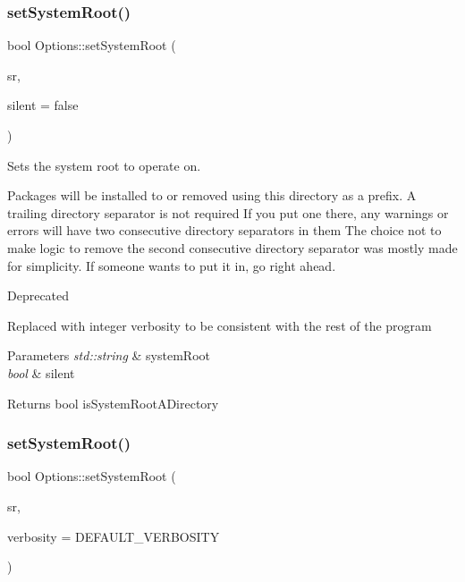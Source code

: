 \subsubsection{\texorpdfstring{setSystemRoot()}{setSystemRoot()}\hspace{0.1cm}{\footnotesize\ttfamily [1/2]}}
{\footnotesize\ttfamily bool Options\+::set\+System\+Root (\begin{DoxyParamCaption}\item[{std\+::string}]{sr,  }\item[{bool}]{silent = {\ttfamily false} }\end{DoxyParamCaption})}



Sets the system root to operate on. 

Packages will be installed to or removed using this directory as a prefix. A trailing directory separator is not required If you put one there, any warnings or errors will have two consecutive directory separators in them The choice not to make logic to remove the second consecutive directory separator was mostly made for simplicity. If someone wants to put it in, go right ahead.

\begin{DoxyRefDesc}{Deprecated}
\item[\mbox{\hyperlink{deprecated__deprecated000011}{Deprecated}}]Replaced with integer verbosity to be consistent with the rest of the program\end{DoxyRefDesc}



\begin{DoxyParams}{Parameters}
{\em std\+::string} & system\+Root \\
\hline
{\em bool} & silent\\
\hline
\end{DoxyParams}
\begin{DoxyReturn}{Returns}
bool is\+System\+Root\+A\+Directory 
\end{DoxyReturn}
\mbox{\label{classOptions_a8411e1ae670a22eae4252895fa17a34d}} 
\subsubsection{\texorpdfstring{setSystemRoot()}{setSystemRoot()}\hspace{0.1cm}{\footnotesize\ttfamily [2/2]}}
{\footnotesize\ttfamily bool Options\+::set\+System\+Root (\begin{DoxyParamCaption}\item[{std\+::string}]{sr,  }\item[{unsigned int}]{verbosity = {\ttfamily DEFAULT\+\_\+VERBOSITY} }\end{DoxyParamCaption})}



